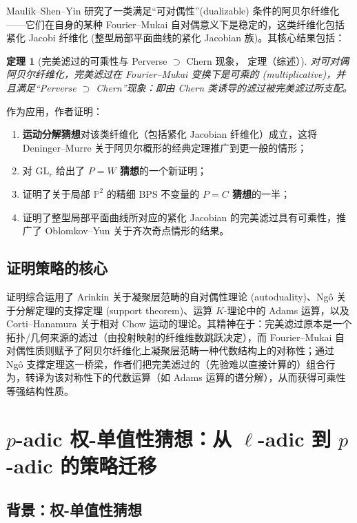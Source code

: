 \documentclass[11pt,a4paper]{article}
\newtheorem{theorem}{定理}[section]
\theoremstyle{definition}
\theoremstyle{remark}
\begin{document}
Maulik--Shen--Yin \cite{MSY2025} 研究了一类满足“可对偶性”(dualizable) 条件的阿贝尔纤维化——它们在自身的某种 Fourier--Mukai 自对偶意义下是稳定的，这类纤维化包括紧化 Jacobi 纤维化 (整型局部平面曲线的紧化 Jacobian 族)。其核心结果包括：

\begin{theorem}[完美滤过的可乘性与 Perverse $\supset$ Chern 现象，\cite{MSY2025} 定理（综述）]
对可对偶阿贝尔纤维化，完美滤过在 Fourier--Mukai 变换下是可乘的 (multiplicative)，并且满足“Perverse $\supset$ Chern”现象：即由 Chern 类诱导的滤过被完美滤过所支配。
\end{theorem}

作为应用，作者证明：

\begin{enumerate}[label=(\alph*)]
  \item \textbf{运动分解猜想}对该类纤维化（包括紧化 Jacobian 纤维化）成立，这将 Deninger--Murre 关于阿贝尔概形的经典定理推广到更一般的情形；
  \item 对 $\mathrm{GL}_r$ 给出了 \textbf{$P=W$ 猜想}的一个新证明；
  \item 证明了关于局部 $\mathbb{P}^2$ 的精细 BPS 不变量的 \textbf{$P=C$ 猜想}的一半；
  \item 证明了整型局部平面曲线所对应的紧化 Jacobian 的完美滤过具有可乘性，推广了 Oblomkov--Yun 关于齐次奇点情形的结果。
\end{enumerate}

\subsection{证明策略的核心}

证明综合运用了 Arinkin 关于凝聚层范畴的自对偶性理论 (autoduality)、Ngô 关于分解定理的支撑定理 (support theorem)、运算 $K$-理论中的 Adams 运算，以及 Corti--Hanamura 关于相对 Chow 运动的理论。其精神在于：完美滤过原本是一个拓扑/几何来源的滤过（由投射映射的纤维维数跳跃决定），而 Fourier--Mukai 自对偶性质则赋予了阿贝尔纤维化上凝聚层范畴一种代数结构上的对称性；通过 Ngô 支撑定理这一桥梁，作者们把完美滤过的（先验难以直接计算的）组合行为，转译为该对称性下的代数运算（如 Adams 运算的谱分解），从而获得可乘性等强结构性质。

\section{$p$-adic 权-单值性猜想：从 $\ell$-adic 到 $p$-adic 的策略迁移}

\subsection{背景：权-单值性猜想}
\end{document}
